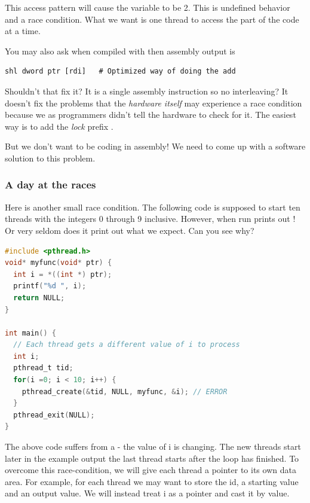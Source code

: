 This access pattern will cause the variable  to be 2.
This is undefined behavior and a race condition.
What we want is one thread to access the part of the code at a time.

You may also ask when compiled with  then assembly output is

\begin{lstlisting}[language={[x86masm]Assembler}]
shl dword ptr [rdi]   # Optimized way of doing the add
\end{lstlisting}

Shouldn't that fix it? It is a single assembly instruction so no interleaving?
It doesn't fix the problems that the \textit{hardware itself} may experience a race condition because we as programmers didn't tell the hardware to check for it.
The easiest way is to add the \textit{lock} prefix \cite[p. 1120]{guide2011intel}.

But we don't want to be coding in assembly!
We need to come up with a software solution to this problem.

\subsubsection{A day at the races}

Here is another small race condition.
The following code is supposed to start ten threads with the integers 0 through 9 inclusive.
However, when run prints out !
Or very seldom does it print out what we expect.
Can you see why?

\begin{lstlisting}[language=C]
#include <pthread.h>
void* myfunc(void* ptr) {
  int i = *((int *) ptr);
  printf("%d ", i);
  return NULL;
}

int main() {
  // Each thread gets a different value of i to process
  int i;
  pthread_t tid;
  for(i =0; i < 10; i++) {
    pthread_create(&tid, NULL, myfunc, &i); // ERROR
  }
  pthread_exit(NULL);
}
\end{lstlisting}

The above code suffers from a  - the value of i is changing.
The new threads start later in the example output the last thread starts after the loop has finished.
To overcome this race-condition, we will give each thread a pointer to its own data area.
For example, for each thread we may want to store the id, a starting value and an output value.
We will instead treat i as a pointer and cast it by value.

